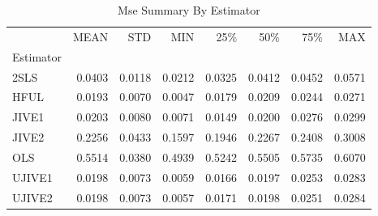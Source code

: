 \begin{table}[ht]
\centering
\caption{Mse Summary By Estimator}
\begin{tabular}{lrrrrrrr}
\toprule
 & MEAN & STD & MIN & 25\% & 50\% & 75\% & MAX \\
Estimator &  &  &  &  &  &  &  \\
\midrule
2SLS & 0.0403 & 0.0118 & 0.0212 & 0.0325 & 0.0412 & 0.0452 & 0.0571 \\
HFUL & 0.0193 & 0.0070 & 0.0047 & 0.0179 & 0.0209 & 0.0244 & 0.0271 \\
JIVE1 & 0.0203 & 0.0080 & 0.0071 & 0.0149 & 0.0200 & 0.0276 & 0.0299 \\
JIVE2 & 0.2256 & 0.0433 & 0.1597 & 0.1946 & 0.2267 & 0.2408 & 0.3008 \\
OLS & 0.5514 & 0.0380 & 0.4939 & 0.5242 & 0.5505 & 0.5735 & 0.6070 \\
UJIVE1 & 0.0198 & 0.0073 & 0.0059 & 0.0166 & 0.0197 & 0.0253 & 0.0283 \\
UJIVE2 & 0.0198 & 0.0073 & 0.0057 & 0.0171 & 0.0198 & 0.0251 & 0.0284 \\
\bottomrule
\end{tabular}
\end{table}
